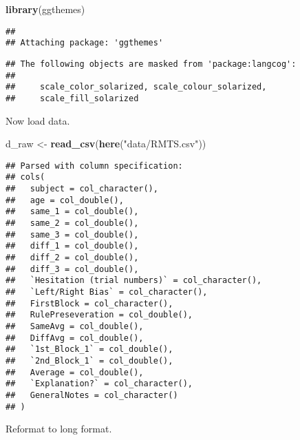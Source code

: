 \documentclass[]{article}
\newenvironment{Shaded}{\begin{snugshade}}{\end{snugshade}}
\newcommand{\KeywordTok}[1]{\textcolor[rgb]{0.13,0.29,0.53}{\textbf{#1}}}
\newcommand{\NormalTok}[1]{#1}
\newcommand{\StringTok}[1]{\textcolor[rgb]{0.31,0.60,0.02}{#1}}
\begin{document}
\begin{Shaded}
\begin{Highlighting}[]
\KeywordTok{library}\NormalTok{(ggthemes)}
\end{Highlighting}
\end{Shaded}

\begin{verbatim}
## 
## Attaching package: 'ggthemes'
\end{verbatim}

\begin{verbatim}
## The following objects are masked from 'package:langcog':
## 
##     scale_color_solarized, scale_colour_solarized,
##     scale_fill_solarized
\end{verbatim}

Now load data.

\begin{Shaded}
\begin{Highlighting}[]
\NormalTok{d_raw <-}\StringTok{ }\KeywordTok{read_csv}\NormalTok{(}\KeywordTok{here}\NormalTok{(}\StringTok{"data/RMTS.csv"}\NormalTok{))}
\end{Highlighting}
\end{Shaded}

\begin{verbatim}
## Parsed with column specification:
## cols(
##   subject = col_character(),
##   age = col_double(),
##   same_1 = col_double(),
##   same_2 = col_double(),
##   same_3 = col_double(),
##   diff_1 = col_double(),
##   diff_2 = col_double(),
##   diff_3 = col_double(),
##   `Hesitation (trial numbers)` = col_character(),
##   `Left/Right Bias` = col_character(),
##   FirstBlock = col_character(),
##   RulePreseveration = col_double(),
##   SameAvg = col_double(),
##   DiffAvg = col_double(),
##   `1st_Block_1` = col_double(),
##   `2nd_Block_1` = col_double(),
##   Average = col_double(),
##   `Explanation?` = col_character(),
##   GeneralNotes = col_character()
## )
\end{verbatim}

Reformat to long format.
\end{document}
